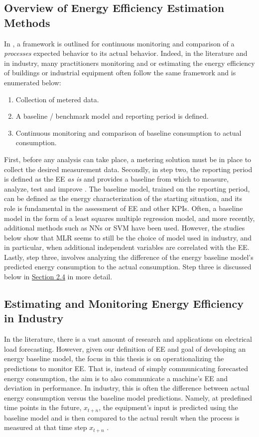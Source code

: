 \subsection{Overview of Energy Efficiency Estimation Methods}

In \cite{kini_methodology_2011}, a framework is outlined for continuous monitoring and comparison of a \textit{processes} expected behavior to its actual behavior. Indeed, in the literature and in industry, many practitioners monitoring and or estimating the energy efficiency of buildings or industrial equipment often follow the same framework and is enumerated below: 

\begin{enumerate}
    \item Collection of metered data.
    \item A baseline / benchmark model and reporting period is defined.
    \item Continuous monitoring and comparison of baseline consumption to actual consumption.
\end{enumerate}

First, before any analysis can take place, a metering solution must be in place to collect the desired measurement data. Secondly, in step two, the reporting period is defined as the EE \textit{as is} and provides a baseline from which to measure, analyze, test and improve \cite{oakland_statistical_2008}. The baseline model, trained on the reporting period, can be defined as the energy characterization of the starting situation, and its role is fundamental in the assessment of EE and other \ac{KPIs}. Often, a baseline model in the form of a least squares multiple regression model, and more recently, additional methods such as \ac{NNs} or \ac{SVM} have been used. However, the studies below show that  \ac{MLR} seems to still be the choice of model used in industry, and in particular, when additional independent variables are correlated with the EE. Lastly, step three, involves analyzing the difference of the energy baseline model's predicted energy consumption to the actual consumption. Step three is discussed below in \hyperlink{subsection.2.4}{Section 2.4} in more detail.

\subsection{Estimating and Monitoring Energy Efficiency in Industry}

In the literature, there is a vast amount of research and applications on electrical load forecasting. However, given our definition of EE and goal of developing an energy baseline model, the focus in this thesis is on operationalizing the predictions to monitor EE. That is, instead of simply communicating forecasted energy consumption, the aim is to also communicate a machine's EE and deviation in performance. In industry, this is often the difference between actual energy consumption versus the baseline model predictions. Namely, at predefined time points in the future, $x_{t+n}$, the equipment's input is predicted using the baseline model and is then compared to the actual result when the process is measured at that time step $x_{t+n}$ \cite{tightening}. 

